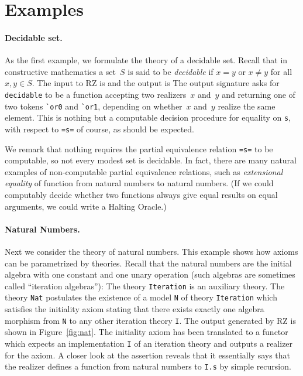 \section{Examples}
\label{sec:examples}

\paragraph{Decidable set.}
\label{sec:decidable-set}

As the first example, we formulate the theory of a decidable set.
Recall that in constructive mathematics a set~$S$ is said to be
\emph{decidable} if $x = y$ or $x \neq y$ for all $x, y \in S$.
The input to RZ is
%
{\small{}}%
%
\noindent
and the output is
%
{\small{}}
%
\noindent
The output signature asks for \Verb|decidable| to be a function
accepting two realizers~$x$ and~$y$ and returning one of two tokens
\Verb|`or0| and \Verb|`or1|, depending on whether~$x$ and~$y$ realize
the same element. This is nothing but a computable decision procedure
for equality on \Verb|s|, with respect to \Verb|=s=| of course, as
should be expected.

We remark that nothing requires the partial equivalence relation
\Verb|=s=| to be computable, so not every modest set is decidable. In
fact, there are many natural examples of non-computable partial
equivalence relations, such as \emph{extensional equality} of function
from natural numbers to natural numbers. (If we could computably
decide whether two functions always give equal results on equal
arguments, we could write a Halting Oracle.)

\paragraph{Natural Numbers.}
\label{sec:natural-numb}

Next we consider the theory of natural numbers. This example shows how
axioms can be parametrized by theories. Recall that the natural
numbers are the initial algebra with one constant and one unary
operation (such algebras are sometimes called ``iteration algebras''):
%
{\small{}}%
%
\noindent
The theory \Verb|Iteration| is an auxiliary theory. The theory
\Verb|Nat| postulates the existence of a model \Verb|N| of theory
\Verb|Iteration| which satisfies the initiality axiom stating that
there exists exactly one algebra morphism from \Verb|N| to any other
iteration theory \Verb|I|. The output generated by RZ is shown in
Figure~\ref{fig:nat}. The initiality axiom has been translated to a
functor which expects an implementation \Verb|I| of an iteration
theory and outputs a realizer for the axiom. A closer look at the
assertion reveals that it essentially says that the realizer defines a
function from natural numbers to \Verb|I.s| by simple recursion.

